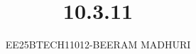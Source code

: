 \documentclass[journal]{IEEEtran}
\begin{document}

\vspace{3cm}

\title{10.3.11}
\author{EE25BTECH11012-BEERAM MADHURI}
{\let\newpage\relax\maketitle}

\renewcommand{\thefigure}{\theenumi}
\renewcommand{\thetable}{\theenumi}
\setlength{\intextsep}{10pt} %


\renewcommand{\thetable}{\theenumi}
\end{document}
